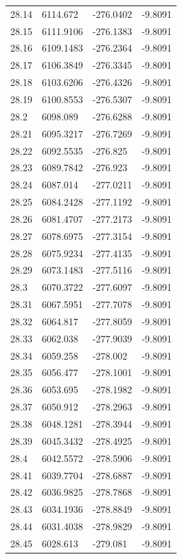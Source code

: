 \begin{table}[H]
\begin{tabular}{llll}
28.14 & 6114.672 & -276.0402 & -9.8091 \\
28.15 & 6111.9106 & -276.1383 & -9.8091 \\
28.16 & 6109.1483 & -276.2364 & -9.8091 \\
28.17 & 6106.3849 & -276.3345 & -9.8091 \\
28.18 & 6103.6206 & -276.4326 & -9.8091 \\
28.19 & 6100.8553 & -276.5307 & -9.8091 \\
28.2 & 6098.089 & -276.6288 & -9.8091 \\
28.21 & 6095.3217 & -276.7269 & -9.8091 \\
28.22 & 6092.5535 & -276.825 & -9.8091 \\
28.23 & 6089.7842 & -276.923 & -9.8091 \\
28.24 & 6087.014 & -277.0211 & -9.8091 \\
28.25 & 6084.2428 & -277.1192 & -9.8091 \\
28.26 & 6081.4707 & -277.2173 & -9.8091 \\
28.27 & 6078.6975 & -277.3154 & -9.8091 \\
28.28 & 6075.9234 & -277.4135 & -9.8091 \\
28.29 & 6073.1483 & -277.5116 & -9.8091 \\
28.3 & 6070.3722 & -277.6097 & -9.8091 \\
28.31 & 6067.5951 & -277.7078 & -9.8091 \\
28.32 & 6064.817 & -277.8059 & -9.8091 \\
28.33 & 6062.038 & -277.9039 & -9.8091 \\
28.34 & 6059.258 & -278.002 & -9.8091 \\
28.35 & 6056.477 & -278.1001 & -9.8091 \\
28.36 & 6053.695 & -278.1982 & -9.8091 \\
28.37 & 6050.912 & -278.2963 & -9.8091 \\
28.38 & 6048.1281 & -278.3944 & -9.8091 \\
28.39 & 6045.3432 & -278.4925 & -9.8091 \\
28.4 & 6042.5572 & -278.5906 & -9.8091 \\
28.41 & 6039.7704 & -278.6887 & -9.8091 \\
28.42 & 6036.9825 & -278.7868 & -9.8091 \\
28.43 & 6034.1936 & -278.8849 & -9.8091 \\
28.44 & 6031.4038 & -278.9829 & -9.8091 \\
28.45 & 6028.613 & -279.081 & -9.8091 \\

\end{tabular}
\end{table}
